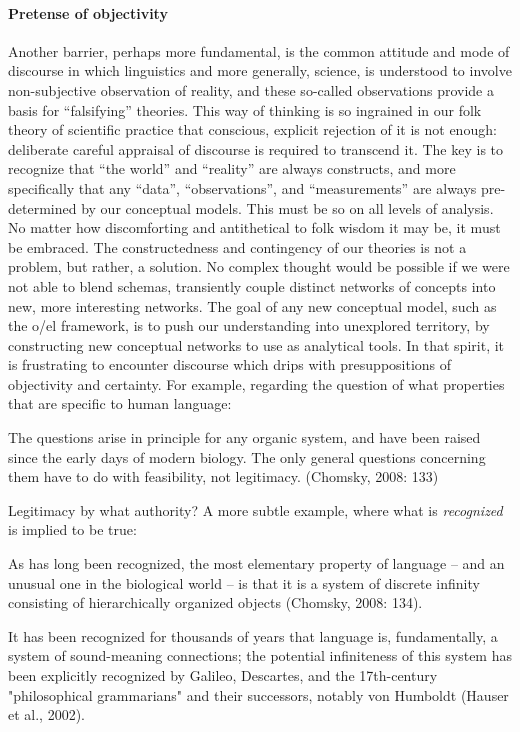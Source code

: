 \paragraph{Pretense of objectivity}

Another barrier, perhaps more fundamental, is the common attitude and mode of discourse in which linguistics and more generally, science, is understood to involve non-subjective observation of reality, and these so-called observations provide a basis for “falsifying” theories. This way of thinking is so ingrained in our folk theory of scientific practice that conscious, explicit rejection of it is not enough: deliberate careful appraisal of discourse is required to transcend it. The key is to recognize that “the world” and “reality” are always constructs, and more specifically that any “data”, “observations”, and “measurements” are always pre-determined by our conceptual models. This must be so on all levels of analysis. No matter how discomforting and antithetical to folk wisdom it may be, it must be embraced. The constructedness and contingency of our theories is not a problem, but rather, a solution. No complex thought would be possible if we were not able to blend schemas, transiently couple distinct networks of concepts into new, more interesting networks. The goal of any new conceptual model, such as the o/el framework, is to push our understanding into unexplored territory, by constructing new conceptual networks to use as analytical tools. In that spirit, it is frustrating to encounter discourse which drips with presuppositions of objectivity and certainty. For example, regarding the question of what properties that are specific to human language:

The questions arise in principle for any organic system, and have been raised since the early days of modern biology. The only general questions concerning them have to do with feasibility, not legitimacy. (Chomsky, 2008: 133)

Legitimacy by what authority? A more subtle example, where what is \textit{recognized} is implied to be true:

As has long been recognized, the most elementary property of language – and an unusual one in the biological world – is that it is a system of discrete infinity consisting of hierarchically organized objects (Chomsky, 2008: 134).

It has been recognized for thousands of years that language is, fundamentally, a system of sound-meaning connections; the potential infiniteness of this system has been explicitly recognized by Galileo, Descartes, and the 17th-century "philosophical grammarians" and their successors, notably von Humboldt (Hauser et al., 2002).

